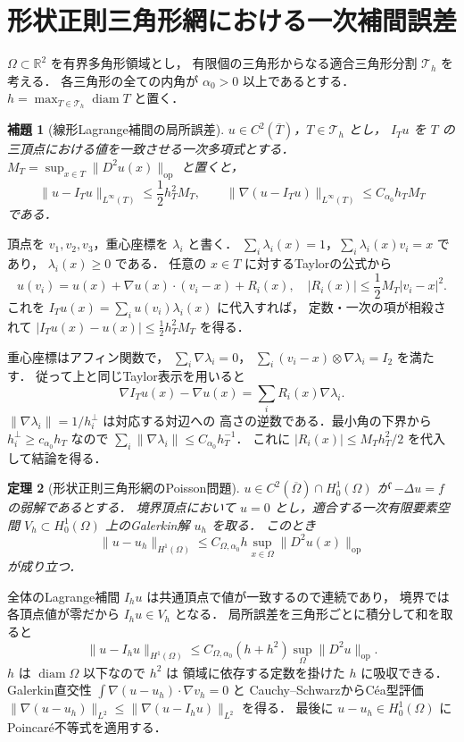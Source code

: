\documentclass[a5paper,10pt,onecolumn]{jsarticle}
\makeatletter
\theoremstyle{mathnotetheorem}
\newtheorem{theorem}{定理}[section]
\newtheorem{lemma}[theorem]{補題}
\renewcommand{\proofname}{証明}
\renewenvironment{proof}[1][\proofname]{%
  \par\pushQED{\qed}\normalfont\topsep4\p@\@plus2\p@\relax
  \trivlist\item[\hskip\labelsep\bfseries #1]\ignorespaces
}{\popQED\endtrivlist\@endpefalse}
\newcommand{\norm}[1]{\lVert #1\rVert}
\makeatother
\begin{document}
\section{形状正則三角形網における一次補間誤差}
$\Omega\subset\mathbb R^2$ を有界多角形領域とし，
有限個の三角形からなる適合三角形分割 $\mathcal T_h$ を考える．
各三角形の全ての内角が $\alpha_0>0$ 以上であるとする．
$h=\max_{T\in\mathcal T_h}\operatorname{diam}T$ と置く．
\begin{lemma}[線形Lagrange補間の局所誤差]
$u\in C^2(\overline T)$，$T\in\mathcal T_h$ とし，
$I_Tu$ を $T$ の三頂点における値を一致させる一次多項式とする．
$M_T=\sup_{x\in T}\norm{D^2u(x)}_{\mathrm{op}}$ と置くと，
\[
 \norm{u-I_Tu}_{L^\infty(T)}\le\frac12h_T^2M_T,
 \qquad
 \norm{\nabla(u-I_Tu)}_{L^\infty(T)}\le C_{\alpha_0}h_TM_T
\]
である．
\end{lemma}
\begin{proof}
頂点を $v_1,v_2,v_3$，重心座標を $\lambda_i$ と書く．
$\sum_i\lambda_i(x)=1$，$\sum_i\lambda_i(x)v_i=x$ であり，
$\lambda_i(x)\ge0$ である．
任意の $x\in T$ に対するTaylorの公式から
\[
 u(v_i)=u(x)+\nabla u(x)\cdot(v_i-x)+R_i(x),
 \quad|R_i(x)|\le\frac12M_T|v_i-x|^2.
\]
これを $I_Tu(x)=\sum_i u(v_i)\lambda_i(x)$ に代入すれば，
定数・一次の項が相殺されて
$|I_Tu(x)-u(x)|\le\frac12h_T^2M_T$ を得る．

重心座標はアフィン関数で，
$\sum_i\nabla\lambda_i=0$，
$\sum_i(v_i-x)\otimes\nabla\lambda_i=I_2$ を満たす．
従って上と同じTaylor表示を用いると
\[
 \nabla I_Tu(x)-\nabla u(x)=\sum_i R_i(x)\nabla\lambda_i.
\]
$\norm{\nabla\lambda_i}=1/h_i^{\perp}$ は対応する対辺への
高さの逆数である．最小角の下界から
$h_i^{\perp}\ge c_{\alpha_0}h_T$ なので
$\sum_i\norm{\nabla\lambda_i}\le C_{\alpha_0}h_T^{-1}$．
これに $|R_i(x)|\le M_Th_T^2/2$ を代入して結論を得る．
\end{proof}
\begin{theorem}[形状正則三角形網のPoisson問題]
$u\in C^2(\overline\Omega)\cap H^1_0(\Omega)$ が
$-\Delta u=f$ の弱解であるとする．
境界頂点において $u=0$ とし，適合する一次有限要素空間
$V_h\subset H^1_0(\Omega)$ 上のGalerkin解 $u_h$ を取る．
このとき
\[
 \norm{u-u_h}_{H^1(\Omega)}
 \le C_{\Omega,\alpha_0}h
 \sup_{x\in\Omega}\norm{D^2u(x)}_{\mathrm{op}}
\]
が成り立つ．
\end{theorem}
\begin{proof}
全体のLagrange補間 $I_hu$ は共通頂点で値が一致するので連続であり，
境界では各頂点値が零だから $I_hu\in V_h$ となる．
局所誤差を三角形ごとに積分して和を取ると
\[
 \norm{u-I_hu}_{H^1(\Omega)}
 \le C_{\Omega,\alpha_0}(h+h^2)
 \sup_{\Omega}\norm{D^2u}_{\mathrm{op}}.
\]
$h$ は $\operatorname{diam}\Omega$ 以下なので $h^2$ は
領域に依存する定数を掛けた $h$ に吸収できる．
Galerkin直交性 $\int\nabla(u-u_h)\cdot\nabla v_h=0$ と
Cauchy--SchwarzからC\'ea型評価
$\norm{\nabla(u-u_h)}_{L^2}
 \le\norm{\nabla(u-I_hu)}_{L^2}$ を得る．
最後に $u-u_h\in H^1_0(\Omega)$ にPoincar\'e不等式を適用する．
\end{proof}
\end{document}
